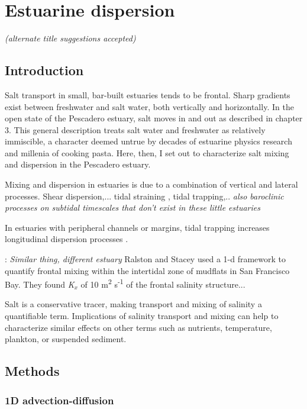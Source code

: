 \chapter{Estuarine dispersion}
\label{chSalt}

\emph{(alternate title suggestions accepted)}

\section{Introduction}

Salt transport in small, bar-built estuaries tends to be frontal. Sharp gradients exist between freshwater and salt water, both vertically and horizontally. In the open state of the Pescadero estuary, salt moves in and out as described in chapter 3. This general description treats salt water and freshwater as relatively immiscible, a character deemed untrue by decades of estuarine physics research and millenia of cooking pasta. Here, then, I set out to characterize salt mixing and dispersion in the Pescadero estuary. 

Mixing and dispersion in estuaries is due to a combination of vertical and lateral processes. Shear dispersion,... tidal straining \parencite{Simpson:1990aa}, tidal trapping,.. \emph{also baroclinic processes on subtidal timescales that don't exist in these little estuaries}

In estuaries with peripheral channels or margins, tidal trapping increases longitudinal dispersion processes \parencite{okubo_effect_1973}. 

\parencite{Ralston:2005aa}: \emph{Similar thing, different estuary}
Ralston and Stacey \cite{Ralston:2005aa} used a 1-d framework to quantify frontal mixing within the intertidal zone of mudflats in San Francisco Bay. They found \emph{K$_x$} of 10 m\textsuperscript{2} s\textsuperscript{-1} of the frontal salinity structure...

Salt is a conservative tracer, making transport and mixing of salinity a quantifiable term. Implications of salinity transport and mixing can help to characterize similar effects on other terms such as nutrients, temperature, plankton, or suspended sediment. 

\section{Methods} \label{sec:ch4methods}

\subsection{1D advection-diffusion} \label{ssec:1dadvdif}

